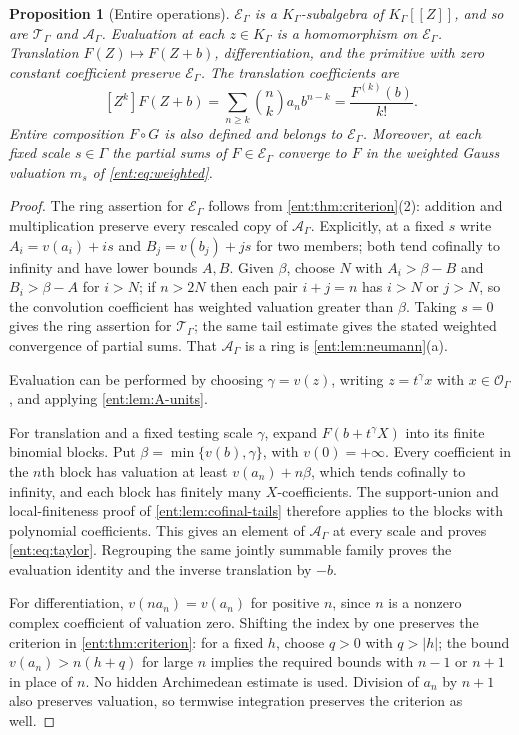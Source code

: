 \documentclass[11pt]{article}
\theoremstyle{plain}
\theoremstyle{plain}
\newtheorem{proposition}[proposition]{Proposition}
\theoremstyle{plain}
\theoremstyle{definition}
\theoremstyle{definition}
\theoremstyle{definition}
\theoremstyle{definition}
\theoremstyle{remark}
\newcommand{\K}{K_\Gamma}\newcommand{\KD}{K_\Delta}
\newcommand{\E}{\mathcal E_\Gamma}
\newcommand{\A}{\mathcal A_\Gamma}\newcommand{\OO}{\mathcal O_\Gamma}
\newcommand{\TT}{\mathcal T_\Gamma}
\begin{document}
\begin{proposition}[Entire operations]\label{ent:prop:operations}
$\E$ is a $\K$-subalgebra of $\K[[Z]]$, and so are $\TT$ and $\A$.
Evaluation at each $z\in\K$ is a homomorphism on $\E$. Translation
$F(Z)\mapsto F(Z+b)$, differentiation, and the primitive with zero constant
coefficient preserve $\E$. The translation coefficients are
\begin{equation}\label{ent:eq:taylor}
 [Z^k]F(Z+b)=\sum_{n\ge k}\binom nk a_n b^{n-k}
 =\frac{F^{(k)}(b)}{k!}.
\end{equation}
Entire composition $F\circ G$ is also defined and belongs to $\E$. Moreover,
at each fixed scale $s\in\Gamma$ the partial sums of $F\in\E$ converge to $F$
in the weighted Gauss valuation $m_s$ of \eqref{ent:eq:weighted}.
\end{proposition}
\begin{proof}
The ring assertion for $\E$ follows from \cref{ent:thm:criterion}(2):
addition and multiplication preserve every rescaled copy of $\A$. Explicitly,
at a fixed $s$ write $A_i=v(a_i)+is$ and $B_j=v(b_j)+js$ for two members;
both tend cofinally to infinity and have lower bounds $A,B$. Given $\beta$,
choose $N$ with $A_i>\beta-B$ and $B_i>\beta-A$ for $i>N$; if $n>2N$ then
each pair $i+j=n$ has $i>N$ or $j>N$, so the convolution coefficient has
weighted valuation greater than $\beta$. Taking $s=0$ gives the ring
assertion for $\TT$; the same tail estimate gives the stated weighted
convergence of partial sums. That $\A$ is a ring is
\cref{ent:lem:neumann}(a).

Evaluation can be performed by choosing $\gamma=v(z)$, writing
$z=t^\gamma x$ with $x\in\OO$, and applying \cref{ent:lem:A-units}.

For translation and a fixed testing scale $\gamma$, expand
$F(b+t^\gamma X)$ into its finite binomial blocks. Put
$\beta=\min\{v(b),\gamma\}$, with $v(0)=+\infty$. Every coefficient in the
$n$th block has valuation at least $v(a_n)+n\beta$, which tends cofinally to
infinity, and each block has finitely many $X$-coefficients. The
support-union and local-finiteness proof of \cref{ent:lem:cofinal-tails}
therefore applies to the blocks with polynomial coefficients. This gives an
element of $\A$ at every scale and proves \eqref{ent:eq:taylor}. Regrouping
the same jointly summable family proves the evaluation identity and the
inverse translation by $-b$.

For differentiation, $v(na_n)=v(a_n)$ for positive $n$, since $n$ is a
nonzero complex coefficient of valuation zero. Shifting the index by one
preserves the criterion in \cref{ent:thm:criterion}: for a fixed $h$, choose
$q>0$ with $q>|h|$; the bound $v(a_n)>n(h+q)$ for large $n$ implies the
required bounds with $n-1$ or $n+1$ in place of $n$. No hidden Archimedean
estimate is used. Division of $a_n$ by $n+1$ also preserves valuation, so
termwise integration preserves the criterion as well.


\end{proof}
\end{document}
